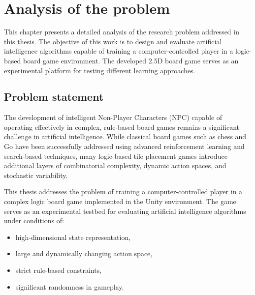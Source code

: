 
\chapter{Analysis of the problem}
\label{chap::Analysis}
This chapter presents a detailed analysis of the research problem addressed in this thesis. The objective of this work is to design and evaluate artificial intelligence algorithms capable of training a computer-controlled player in a logic-based board game environment. The developed 2.5D board game serves as an experimental platform for testing different learning approaches.


\section{Problem statement}
The development of intelligent Non-Player Characters (NPC) capable of operating effectively in complex, rule-based board games remains a significant challenge in artificial intelligence. While classical board games such as chess and Go have been successfully addressed using advanced reinforcement learning and search-based techniques, many logic-based tile placement games introduce additional layers of combinatorial complexity, dynamic action spaces, and stochastic variability.

This thesis addresses the problem of training a computer-controlled player in a complex logic board game implemented in the Unity environment. The game serves as an experimental testbed for evaluating artificial intelligence algorithms under conditions of:
\begin{itemize}
	\item high-dimensional state representation,
	\item large and dynamically changing action space,
	\item strict rule-based constraints,
	\item significant randomness in gameplay.
\end{itemize}

